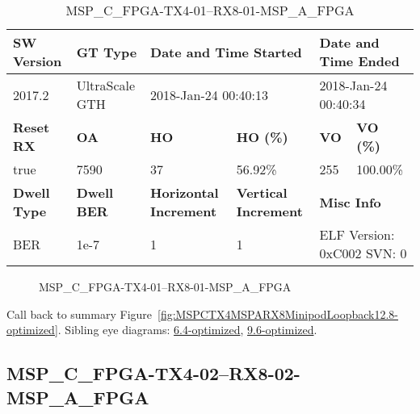 \begin{table}[h]
\centering
\caption{MSP\_C\_FPGA-TX4-01--RX8-01-MSP\_A\_FPGA}
\label{tab:MSPCFPGATX401RX801MSPAFPGA12.8-optimized}
\begin{tabular}{@{}|l|l|l|l|l|l|@{}}
\toprule
\textbf{SW Version}                & \textbf{GT Type}   & \multicolumn{2}{l|}{\textbf{Date and Time Started}}            & \multicolumn{2}{l|}{\textbf{Date and Time Ended}}        \\ \midrule
2017.2                       & UltraScale GTH          & \multicolumn{2}{l|}{2018-Jan-24 00:40:13}                   & \multicolumn{2}{l|}{2018-Jan-24 00:40:34}               \\ \midrule
\textbf{Reset RX}                  & \textbf{OA} & \textbf{HO}   & \textbf{HO (\%)} & \textbf{VO} & \textbf{VO (\%)} \\ \midrule
true & 7590        & 37          & 56.92\%        & 255        & 100.00\%       \\ \midrule
\textbf{Dwell Type}                & \textbf{Dwell BER} & \textbf{Horizontal Increment} & \textbf{Vertical Increment}    & \multicolumn{2}{l|}{\textbf{Misc Info}}                  \\ \midrule
BER                            & 1e-7        & 1        & 1           & \multicolumn{2}{l|}{ELF Version: 0xC002 SVN: 0}                         \\ \bottomrule
\end{tabular}
\end{table}

\begin{figure}[h]
\caption{MSP\_C\_FPGA-TX4-01--RX8-01-MSP\_A\_FPGA} \label{fig:MSPCFPGATX401RX801MSPAFPGA12.8-optimized}
\end{figure}

Call back to summary Figure~\ref{fig:MSPCTX4MSPARX8MinipodLoopback12.8-optimized}.
Sibling eye diagrams: \hyperref[sec:MSPCFPGATX401RX801MSPAFPGA6.4-optimized]{6.4-optimized}, \hyperref[sec:MSPCFPGATX401RX801MSPAFPGA9.6-optimized]{9.6-optimized}.

\clearpage
\newpage


\subsection{MSP\_C\_FPGA-TX4-02--RX8-02-MSP\_A\_FPGA}\label{sec:MSPCFPGATX402RX802MSPAFPGA12.8-optimized}

